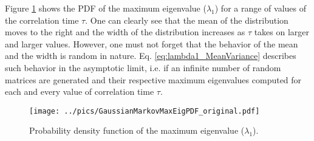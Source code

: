 \documentclass{book}
\begin{document}
Figure \ref{fig:GaussianMarkovMaxEigPDF_original} shows the PDF of the
maximum eigenvalue ($\lambda_1$) for a range of values of the
correlation time $\tau$. One can clearly see that the mean of the
distribution moves to the right and the width of the distribution
increases as $\tau$ takes on larger and larger values. However, one
must not forget that the behavior of the mean and the width is random
in nature. Eq. \ref{eq:lambda1_MeanVariance} describes such behavior in
the asymptotic limit, i.e. if an infinite number of random matrices
are generated and their respective maximum eigenvalues computed for
each and every value of correlation time $\tau$.
\begin{figure}[htb!]
  \begin{center}
    \texttt{[image: ../pics/GaussianMarkovMaxEigPDF\_original.pdf]}
    \label{fig:GaussianMarkovMaxEigPDF_original}
    \caption{Probability density function of the maximum eigenvalue
      ($\lambda_1$).}
  \end{center}
\end{figure}

\end{document}
